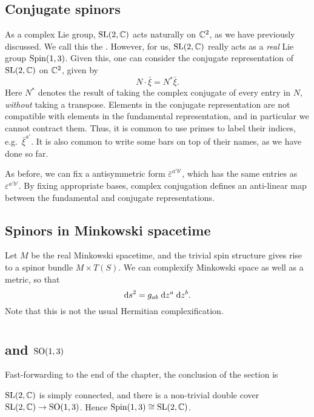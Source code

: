\documentclass[a4paper]{article}
\begin{document}
\subsection{Conjugate spinors}
As a complex Lie group, $\mathrm{SL}(2, \mathbb{C})$ acts naturally on $\mathbb{C}^2$, as we have previously discussed. We call this the . However, for us, $\mathrm{SL}(2, \mathbb{C})$ really acts as a \emph{real} Lie group $\mathrm{Spin}(1, 3)$. Given this, one can consider the conjugate representation of $\mathrm{SL}(2, \mathbb{C})$ on $\mathbb{C}^2$, given by
\[
  N \cdot \bar{\xi} = N^* \bar{\xi}.
\]
Here $N^*$ denotes the result of taking the complex conjugate of every entry in $N$, \emph{without} taking a transpose. Elements in the conjugate representation are not compatible with elements in the fundamental representation, and in particular we cannot contract them. Thus, it is common to use primes to label their indices, e.g.\ $\bar{\xi}^{a'}$. It is also common to write some bars on top of their names, as we have done so far.

As before, we can fix a antisymmetric form $\bar{\varepsilon}^{a'b'}$, which has the same entries as $\varepsilon^{a'b'}$. By fixing appropriate bases, complex conjugation defines an anti-linear map between the fundamental and conjugate representations.

\subsection{Spinors in Minkowski spacetime}
Let $M$ be the real Minkowski spacetime, and the trivial spin structure gives rise to a spinor bundle $M \times T(S)$. We can complexify Minkowski space as well as a metric, so that
\[
  \mathrm{d} s^2 = g_{ab} \;\mathrm{d} z^a \;\mathrm{d} z^b.
\]
Note that this is not the usual Hermitian complexification.

\section{}
\subsection{ and \texorpdfstring{$\mathrm{SO}(1, 3)$}{SO(1, 3)}}
Fast-forwarding to the end of the chapter, the conclusion of the section is
\begin{thm}
  $\mathrm{SL}(2, \mathbb{C})$ is simply connected, and there is a non-trivial double cover $\mathrm{SL}(2, \mathbb{C}) \to \mathrm{SO}(1, 3)$. Hence $\mathrm{Spin}(1, 3) \cong \mathrm{SL}(2, \mathbb{C})$.
\end{thm}
\end{document}
